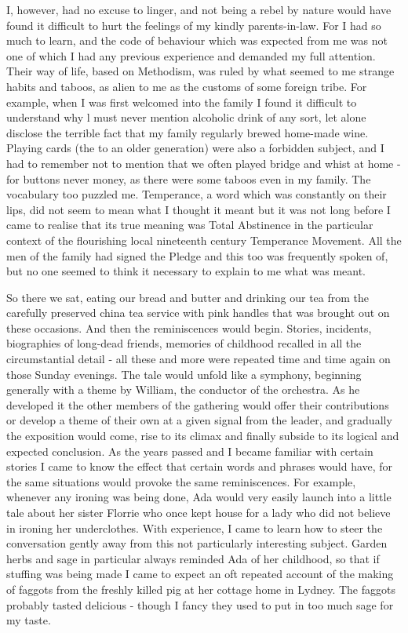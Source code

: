 I, however, had no excuse to linger, and not being a rebel by nature would have found it difficult to hurt the feelings of my kindly parents-in-law. For I had so much to learn, and the code of behaviour which was expected from me was not one of which I had any previous experience and demanded my full attention. Their way of life, based on Methodism, was ruled by what seemed to me strange habits and taboos, as alien to me as the customs of some foreign tribe. For example, when I was first welcomed into the family I found it difficult to understand why l must never mention alcoholic drink of any sort, let alone disclose the terrible fact that my family regularly brewed home-made wine. Playing cards (the  to an older generation) were also a forbidden subject, and I had to remember not to mention that we often played bridge and whist at home - for buttons never money, as there were some taboos even in my family. The vocabulary too puzzled me. Temperance, a word which was constantly on their lips, did not seem to mean what I thought it meant but it was not long before I came to realise that its true meaning was Total  Abstinence in the particular context of the flourishing local nineteenth century Temperance Movement. All the men of the family had signed the Pledge and this too was frequently spoken of, but no one seemed to think it necessary to explain to me what was meant.

So there we sat, eating our bread and butter and drinking our tea from the carefully preserved china tea service with pink handles that was brought out on these occasions. And then the reminiscences would begin. Stories, incidents, biographies of long-dead friends, memories of childhood recalled in all the circumstantial detail - all these and more were repeated time and time again on those Sunday evenings. The tale would unfold like a symphony, beginning generally with a theme by William, the conductor of the orchestra. As he developed it the other members of the gathering would offer their contributions or develop a theme of their own at a given signal from the leader, and gradually the exposition would come, rise to its climax and finally subside to its logical and expected conclusion. As the years passed and I became familiar with certain stories I came to know the effect that certain words and phrases would have, for the same situations would provoke the same reminiscences. For example, whenever any ironing was being done, Ada would very easily launch into a little tale about her sister Florrie who once kept house for a lady who did not believe in ironing her underclothes. With experience, I came to learn how to steer the conversation gently away from this not particularly interesting subject. Garden herbs and sage in particular always reminded Ada of her childhood, so that if stuffing was being made I came to expect an oft repeated account of the making of faggots from the freshly killed pig at her cottage home in Lydney. The faggots probably tasted delicious - though I fancy they used to put in too much sage for my taste.

